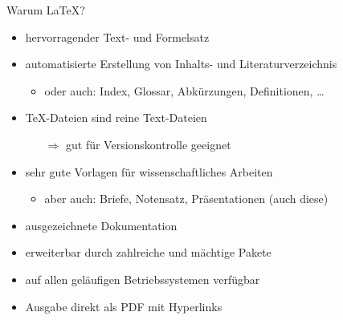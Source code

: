 \begin{frame}{Warum \LaTeX?}
  \begin{itemize}
    \item hervorragender Text- und Formelsatz
    \item automatisierte Erstellung von Inhalts- und Literaturverzeichnis
      \begin{itemize}
        \item oder auch: Index, Glossar, Abkürzungen, Definitionen, \dots
      \end{itemize}
    \item \TeX-Dateien sind reine Text-Dateien
      \begin{itemize}
        \item[$\Rightarrow$] gut für Versionskontrolle geeignet
      \end{itemize}
    \item sehr gute Vorlagen für wissenschaftliches Arbeiten
      \begin{itemize}
      \item aber auch: Briefe, Notensatz, Präsentationen (auch diese)
      \end{itemize}
    \item ausgezeichnete Dokumentation
    \item erweiterbar durch zahlreiche und mächtige Pakete
    \item auf allen geläufigen Betriebssystemen verfügbar
    \item Ausgabe direkt als PDF mit Hyperlinks
  \end{itemize}
\end{frame}

